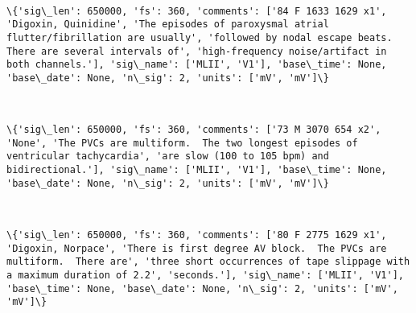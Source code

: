 \documentclass[11pt]{article}
\begin{document}
    \begin{center}
    \end{center}
    { \hspace*{\fill} \\}
    
    \begin{Verbatim}[commandchars=\\\{\}]
\{'sig\_len': 650000, 'fs': 360, 'comments': ['84 F 1633 1629 x1', 'Digoxin, Quinidine', 'The episodes of paroxysmal atrial flutter/fibrillation are usually', 'followed by nodal escape beats.  There are several intervals of', 'high-frequency noise/artifact in both channels.'], 'sig\_name': ['MLII', 'V1'], 'base\_time': None, 'base\_date': None, 'n\_sig': 2, 'units': ['mV', 'mV']\}

    \end{Verbatim}

    \begin{center}
    \end{center}
    { \hspace*{\fill} \\}
    
    \begin{Verbatim}[commandchars=\\\{\}]
\{'sig\_len': 650000, 'fs': 360, 'comments': ['73 M 3070 654 x2', 'None', 'The PVCs are multiform.  The two longest episodes of ventricular tachycardia', 'are slow (100 to 105 bpm) and bidirectional.'], 'sig\_name': ['MLII', 'V1'], 'base\_time': None, 'base\_date': None, 'n\_sig': 2, 'units': ['mV', 'mV']\}

    \end{Verbatim}

    \begin{center}
    \end{center}
    { \hspace*{\fill} \\}
    
    \begin{Verbatim}[commandchars=\\\{\}]
\{'sig\_len': 650000, 'fs': 360, 'comments': ['80 F 2775 1629 x1', 'Digoxin, Norpace', 'There is first degree AV block.  The PVCs are multiform.  There are', 'three short occurrences of tape slippage with a maximum duration of 2.2', 'seconds.'], 'sig\_name': ['MLII', 'V1'], 'base\_time': None, 'base\_date': None, 'n\_sig': 2, 'units': ['mV', 'mV']\}

    \end{Verbatim}
\end{document}
